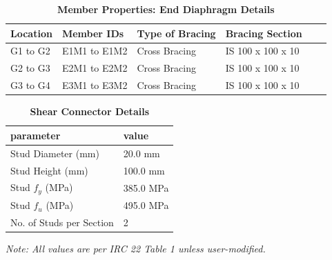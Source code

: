 \documentclass[12pt,a4paper]{report}
\numberwithin{table}{chapter}
\numberwithin{figure}{chapter}
\begin{document}
\vspace{0.4em}
\noindent
\setlength{\tabcolsep}{4pt}
\setlength\LTleft{0pt}
\setlength\LTright{\fill}

\begin{longtable}{|L{2.2cm}|L{2.2cm}|L{3.0cm}|L{2.5cm}|C{1.8cm}|C{1.8cm}|}
\caption{\textbf{Member Properties: End Diaphragm Details}}\\
\hline
\textbf{Location} & \textbf{Member IDs} & \textbf{Type of Bracing} & \textbf{Bracing Section} \\
\hline
G1 to G2 & E1M1 to E1M2 & Cross Bracing & IS 100 x 100 x 10 \\[6pt]
\hline
G2 to G3 & E2M1 to E2M2 & Cross Bracing & IS 100 x 100 x 10 \\[6pt]
\hline
G3 to G4 & E3M1 to E3M2 & Cross Bracing & IS 100 x 100 x 10 \\[6pt]
\hline
\end{longtable}



\label{subsec:shear-connectors}

\vspace{2.2em}

\vspace{0.4em}
\begin{longtable}{|L{5.5cm}|p{10.0cm}|}
\caption{\textbf{Shear Connector Details}}\\
\hline
\textbf{parameter} & \textbf{value} \\
\hline
\textnormal{Stud Diameter (mm)} & 20.0 mm \\[6pt]
\hline
\textnormal{Stud Height (mm)} & 100.0 mm \\[6pt]
\hline
\textnormal{Stud $f_y$ (MPa)} & 385.0 MPa \\[6pt]
\hline
\textnormal{Stud $f_u$ (MPa)} & 495.0 MPa \\[6pt]
\hline
\textnormal{No. of Studs per Section} & 2 \\[6pt]
\hline
\end{longtable}



\label{subsec:safety-factors}

\vspace{2.2em}

\vspace{0.3em}
\noindent\textit{Note: All values are per IRC 22 Table 1 unless user-modified.}
\end{document}
